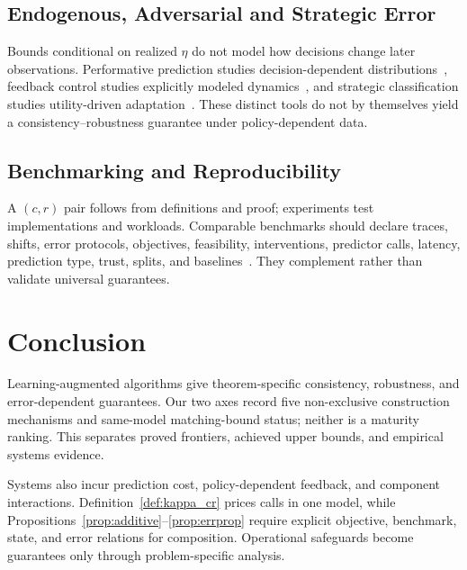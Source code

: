 \documentclass[acmsmall,screen,nonacm]{acmart}
\theoremstyle{acmdefinition}%
\begin{document}
\subsection{Endogenous, Adversarial and Strategic Error}
\label{subsec:adversarial}

Bounds conditional on realized $\eta$ do not model how decisions change later observations. Performative prediction studies decision-dependent distributions~\cite{perdomo2020performative}, feedback control studies explicitly modeled dynamics~\cite{astrom2008feedback}, and strategic classification studies utility-driven adaptation~\cite{hardt2016strategic}. These distinct tools do not by themselves yield a consistency--robustness guarantee under policy-dependent data.

\subsection{Benchmarking and Reproducibility}
\label{subsec:bench}

A $(c,r)$ pair follows from definitions and proof; experiments test implementations and workloads. Comparable benchmarks should declare traces, shifts, error protocols, objectives, feasibility, interventions, predictor calls, latency, prediction type, trust, splits, and baselines~\cite{chledowski2021robust,wongkham2022updatable,wang2021cardinality}. They complement rather than validate universal guarantees.

%
\section{Conclusion}
\label{sec:conclusion}

Learning-augmented algorithms give theorem-specific consistency, robustness, and error-dependent guarantees. Our two axes record five non-exclusive construction mechanisms and same-model matching-bound status; neither is a maturity ranking. This separates proved frontiers, achieved upper bounds, and empirical systems evidence.

Systems also incur prediction cost, policy-dependent feedback, and component interactions. Definition~\ref{def:kappa_cr} prices calls in one model, while Propositions~\ref{prop:additive}--\ref{prop:errprop} require explicit objective, benchmark, state, and error relations for composition. Operational safeguards become guarantees only through problem-specific analysis.

%
%
%
%
  {}%
  {%
   }

\end{document}

